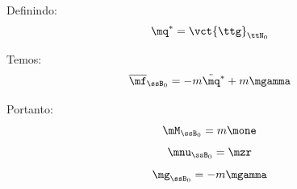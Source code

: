 \documentclass[]{politex}
\begin{document}
Definindo:
\begin{equation}
\mq^\ast = \vct{\ttg}_{\ttN_0}
\end{equation}

Temos:
\begin{equation} \label{eq:Newton-EulerMat2E}
\overline{\mf}_{\ssB_0} = -m \ddot{\mq}^\ast + m \mgamma
\end{equation}

Portanto:
\begin{equation} \label{eq:M_efetuador}
\mM_{\ssB_0} = m \mone
\end{equation}
\begin{equation} \label{eq:v_efetuador}
\mnu_{\ssB_0} = \mzr
\end{equation}
\begin{equation} \label{eq:g_efetuador}
\mg_{\ssB_0} = -m \mgamma
\end{equation}
\end{document}
